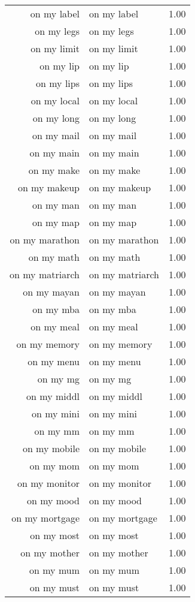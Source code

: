 \begin{table}[ht]
\begin{tabular}{rlr}
  on my label & on my label & 1.00 \\ 
  on my legs & on my legs & 1.00 \\ 
  on my limit & on my limit & 1.00 \\ 
  on my lip & on my lip & 1.00 \\ 
  on my lips & on my lips & 1.00 \\ 
  on my local & on my local & 1.00 \\ 
  on my long & on my long & 1.00 \\ 
  on my mail & on my mail & 1.00 \\ 
  on my main & on my main & 1.00 \\ 
  on my make & on my make & 1.00 \\ 
  on my makeup & on my makeup & 1.00 \\ 
  on my man & on my man & 1.00 \\ 
  on my map & on my map & 1.00 \\ 
  on my marathon & on my marathon & 1.00 \\ 
  on my math & on my math & 1.00 \\ 
  on my matriarch & on my matriarch & 1.00 \\ 
  on my mayan & on my mayan & 1.00 \\ 
  on my mba & on my mba & 1.00 \\ 
  on my meal & on my meal & 1.00 \\ 
  on my memory & on my memory & 1.00 \\ 
  on my menu & on my menu & 1.00 \\ 
  on my mg & on my mg & 1.00 \\ 
  on my middl & on my middl & 1.00 \\ 
  on my mini & on my mini & 1.00 \\ 
  on my mm & on my mm & 1.00 \\ 
  on my mobile & on my mobile & 1.00 \\ 
  on my mom & on my mom & 1.00 \\ 
  on my monitor & on my monitor & 1.00 \\ 
  on my mood & on my mood & 1.00 \\ 
  on my mortgage & on my mortgage & 1.00 \\ 
  on my most & on my most & 1.00 \\ 
  on my mother & on my mother & 1.00 \\ 
  on my mum & on my mum & 1.00 \\ 
  on my must & on my must & 1.00 \\ 

\end{tabular}
\end{table}
